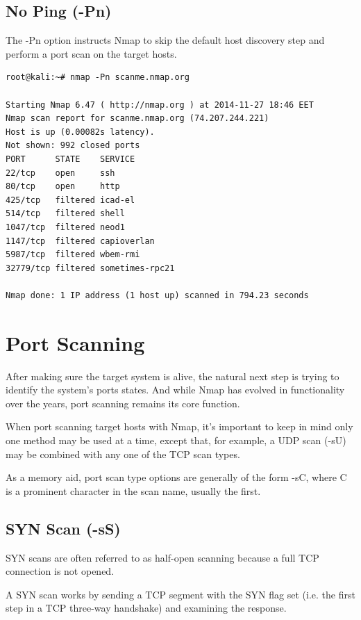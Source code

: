 \documentclass[a4paper,oneside,12pt]{book}
\begin{document}
\section{No Ping (-Pn)}

The -Pn option instructs Nmap to skip the default host discovery step and perform a port scan on the target hosts.

\begin{lstlisting}[title=A sample Nmap scan using the No Ping option]
root@kali:~# nmap -Pn scanme.nmap.org

Starting Nmap 6.47 ( http://nmap.org ) at 2014-11-27 18:46 EET
Nmap scan report for scanme.nmap.org (74.207.244.221)
Host is up (0.00082s latency).
Not shown: 992 closed ports
PORT      STATE    SERVICE
22/tcp    open     ssh
80/tcp    open     http
425/tcp   filtered icad-el
514/tcp   filtered shell
1047/tcp  filtered neod1
1147/tcp  filtered capioverlan
5987/tcp  filtered wbem-rmi
32779/tcp filtered sometimes-rpc21

Nmap done: 1 IP address (1 host up) scanned in 794.23 seconds
\end{lstlisting}

\chapter*{Port Scanning}
 

After making sure the target system is alive, the natural next step is trying to identify the system's ports states. And while Nmap has evolved in functionality over the years, port scanning remains its core function.

When port scanning target hosts with Nmap, it's important to keep in mind only one method may be used at a time, except that, for example, a UDP scan (-sU) may be combined with any one of the TCP scan types.

As a memory aid, port scan type options are generally of the form -sC, where C is a prominent character in the scan name, usually the first. 

\section{SYN Scan (-sS)}

SYN scans are often referred to as half-open scanning because a full TCP connection is not opened.

A SYN scan works by sending a TCP segment with the SYN flag set (i.e. the first step in a TCP three-way handshake) and examining the response.
\end{document}
